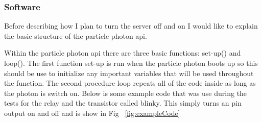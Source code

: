 \documentclass{article}
\begin{document}
\subsubsection{Software}
Before describing how I plan to turn the server off and on I would like to explain the basic structure of
the particle photon api.

Within the particle photon api there are three basic functions: set-up() and loop(). The first function
set-up is run when the particle photon boots up so this should be use to initialize any important variables
that will be used throughout the function. The second procedure loop repeats all of the code inside as long
as the photon is switch on. Below is some example code that was use during the tests for the relay and the
transistor called blinky. This simply turns an pin output on and off and is show in Fig ~\ref{fig:exampleCode}
\end{document}
